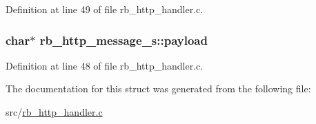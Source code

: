 Definition at line 49 of file rb\-\_\-http\-\_\-handler.\-c.

\hypertarget{structrb__http__message__s_a70cd28f794d09eb47cf19a37fb7ba42b}{
\subsubsection[{payload}]{\setlength{\rightskip}{0pt plus 5cm}char$\ast$ rb\-\_\-http\-\_\-message\-\_\-s\-::payload}}\label{structrb__http__message__s_a70cd28f794d09eb47cf19a37fb7ba42b}


Definition at line 48 of file rb\-\_\-http\-\_\-handler.\-c.



The documentation for this struct was generated from the following file\-:\begin{DoxyCompactItemize}
\item 
src/\hyperlink{rb__http__handler_8c}{rb\-\_\-http\-\_\-handler.\-c}\end{DoxyCompactItemize}
